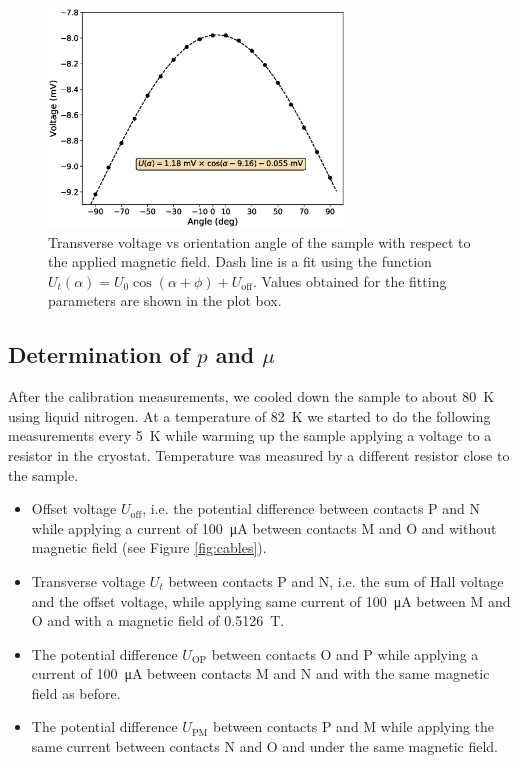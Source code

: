 \documentclass[11pt,a4paper]{article}
\begin{document}
\begin{figure}[H]
\centering
\includegraphics[width=0.7\textwidth]{Voltage_vs_angle.eps}
\caption{Transverse voltage vs orientation angle of the sample with respect to the applied magnetic field. Dash line is a fit using the function $U_t(\alpha)=U_0\cos(\alpha+\phi) + U_\text{off}$. Values obtained for the fitting parameters are shown in the plot box.}
\label{fig:orientation}
\end{figure}

\subsection{Determination of $p$ and $\mu$}

After the calibration measurements, we cooled down the sample to about \SI{80}{\kelvin} using liquid nitrogen. At a temperature of \SI{82}{\kelvin} we started to do the following measurements every \SI{5}{\kelvin} while warming up the sample applying a voltage to a resistor in the cryostat. Temperature was measured by a different resistor close to the sample.
\begin{itemize}
\item Offset voltage $U_\text{off}$, i.e. the potential difference between contacts P and N while applying a current of \SI{100}{\micro\ampere} between contacts M and O and without magnetic field (see Figure \ref{fig:cables}).
\item Transverse voltage $U_t$ between contacts P and N, i.e. the sum of Hall voltage and the offset voltage, while applying same current of \SI{100}{\micro\ampere} between M and O and with a magnetic field of \SI{0.5126}{\tesla}.
\item The potential difference $U_\text{OP}$ between contacts O and P while applying a current of \SI{100}{\micro\ampere} between contacts M and N and with the same magnetic field as before.
\item The potential difference $U_\text{PM}$ between contacts P and M while applying the same current between contacts N and O and under the same magnetic field.
\end{itemize}
\end{document}
